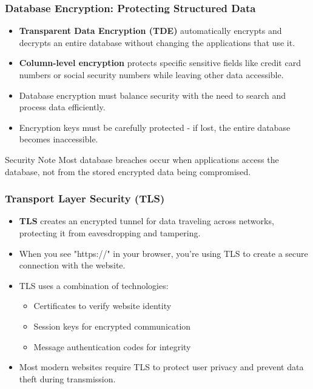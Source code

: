 \documentclass{beamer}
\begin{document}
\begin{frame}
    \frametitle{Database Encryption: Protecting Structured Data}
    
    \begin{itemize}
        \item \textbf{Transparent Data Encryption (TDE)} automatically encrypts and decrypts an entire database without changing the applications that use it.
        
        \item \textbf{Column-level encryption} protects specific sensitive fields like credit card numbers or social security numbers while leaving other data accessible.
        
        \item Database encryption must balance security with the need to search and process data efficiently.
        
        \item Encryption keys must be carefully protected - if lost, the entire database becomes inaccessible.
    \end{itemize}
    
    \begin{alertblock}{Security Note}
        Most database breaches occur when applications access the database, not from the stored encrypted data being compromised.
    \end{alertblock}
\end{frame}

\begin{frame}
    \frametitle{Transport Layer Security (TLS)}
    
    \begin{itemize}
        \item \textbf{TLS} creates an encrypted tunnel for data traveling across networks, protecting it from eavesdropping and tampering.
        
        \item When you see "https://" in your browser, you're using TLS to create a secure connection with the website.
        
        \item TLS uses a combination of technologies:
            \begin{itemize}
                \item Certificates to verify website identity
                \item Session keys for encrypted communication
                \item Message authentication codes for integrity
            \end{itemize}
        
        \item Most modern websites require TLS to protect user privacy and prevent data theft during transmission.
    \end{itemize}
\end{frame}
\end{document}
